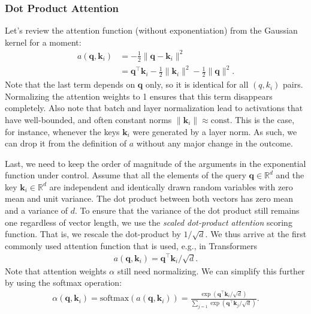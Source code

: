\documentclass[a4paper,12pt]{article}
\theoremstyle{definition}
\begin{document}
\subsubsection*{Dot Product Attention}
Let's review the attention function (without exponentiation) from the Gaussian kernel for a moment:
\begin{equation*}
    \begin{aligned}
    a(\mathbf{q}, \mathbf{k}_i) & = -\frac{1}{2} \|\mathbf{q} - \mathbf{k}_i\|^2  \\
                                & = \mathbf{q}^\top \mathbf{k}_i -\frac{1}{2} \|\mathbf{k}_i\|^2  -\frac{1}{2} \|\mathbf{q}\|^2.
    \end{aligned}
\end{equation*}
Note that the last term depends on $\mathbf{q}$ only, so it is identical for all $(q,k_i)$ pairs. Normalizing the attention weights to 1 ensures that this term disappears completely. 
Also note that batch and layer normalization lead to activations that have well-bounded, and often constant norms $\|\mathbf{k}_i\| \approx \mathrm{const}$. This is the case, 
for instance, whenever the keys $\mathbf{k}_i$ were generated by a layer norm. As such, we can drop it from the definition of $a$ without any major change in the outcome.

Last, we need to keep the order of magnitude of the arguments in the exponential function under control. Assume that all the elements of the query $\mathbf{q} \in \mathbb{R}^d$ 
and the key $\mathbf{k}_i \in \mathbb{R}^d$ are independent and identically drawn random variables with zero mean and unit variance. The dot product between both vectors has 
zero mean and a variance of $d$. To ensure that the variance of the dot product still remains one regardless of vector length, we use the \emph{scaled dot-product attention} scoring function.
That is, we rescale the dot-product by $1/\sqrt{d}$. We thus arrive at the first commonly used attention function that is used, e.g., in Transformers
\begin{equation*}
    \begin{aligned}
        a(\mathbf{q}, \mathbf{k}_i) = \mathbf{q}^\top \mathbf{k}_i / \sqrt{d}.
    \end{aligned}
\end{equation*}
Note that attention weights $\alpha$ still need normalizing. We can simplify this further by using the softmax operation:
\begin{equation*}
    \begin{aligned}
        \alpha(\mathbf{q}, \mathbf{k}_i) = \mathrm{softmax}(a(\mathbf{q}, \mathbf{k}_i)) = \frac{\exp(\mathbf{q}^\top \mathbf{k}_i / \sqrt{d})}{\sum_{j=1} \exp(\mathbf{q}^\top \mathbf{k}_j / \sqrt{d})}.
    \end{aligned}
\end{equation*}
\end{document}
